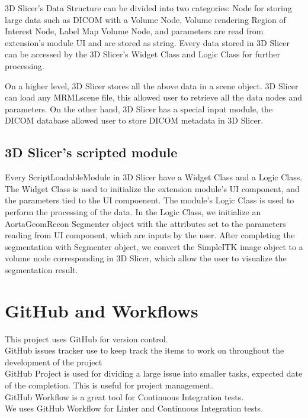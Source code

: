 3D Slicer's Data Structure can be divided into two categories: Node for storing large data such as DICOM with a Volume Node, Volume rendering Region of Interest Node, Label Map Volume Node, and parameters are read from extension's module UI and are stored as string. Every data stored in 3D Slicer can be accessed by the 3D Slicer's Widget Class and Logic Class for further processing.

On a higher level, 3D Slicer stores all the above data in a scene object. 3D Slicer can load any MRMLscene file, this allowed user to retrieve all the data nodes and parameters. On the other hand, 3D Slicer has a special input module, the DICOM database allowed user to store DICOM metadata in 3D Slicer.

\subsection{3D Slicer's scripted module}

Every ScriptLoadableModule in 3D Slicer have a Widget Class and a Logic Class. The Widget Class is used to initialize the extension module's UI component, and the parameters tied to the UI compoenent. The module's Logic Class is used to perform the processing of the data. In the Logic Class, we initialize an AortaGeomRecon Segmenter object with the attributes set to the parameters reading from UI component, which are inputs by the user. After completing the segmentation with Segmenter object, we convert the SimpleITK image object to a volume node corresponding in 3D Slicer, which allow the user to visualize the segmentation result. 

\section{GitHub and Workflows}
This project uses GitHub for version control. \\
GitHub issues tracker use to keep track the items to work on throughout the development of the project\\
GitHub Project is used for dividing a large issue into smaller tasks, expected date of the completion. This is useful for project management.\\
GitHub Workflow is a great tool for Continuous Integration tests. \\
We uses GitHub Workflow for Linter and Continuous Integration tests. 



